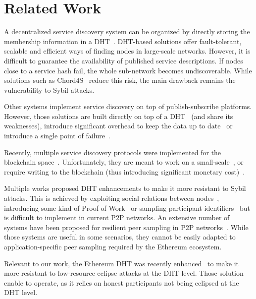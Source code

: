 
\section{Related Work}
\label{sec:related}


A decentralized service discovery system can be organized by directly storing the membership information in a DHT~\cite{can,chord,rowstron2001pastry,maymounkov2002kademlia}. 
DHT-based solutions offer fault-tolerant, scalable and efficient ways of finding nodes in large-scale networks.
However, it is difficult to guarantee the availability of published service descriptions.
If nodes close to a service hash fail, the whole sub-network becomes undiscoverable. 
While solutions such as Chord4S~\cite{chord4s} reduce this risk, the main drawback remains the vulnerability to Sybil attacks.

Other systems implement service discovery on top of publish-subscribe platforms. However, those solutions are built directly on top of a DHT~\cite{scribe,poldercast,banno2015} (and share its weaknesses), introduce significant overhead to keep the data up to date~\cite{gossipsub} or introduce a single point of failure~\cite{baldoni2007tera, dan2012centralized}.


Recently, multiple service discovery protocols were implemented for the blockchain space~\cite{farmer2021decentralized, manevich2019endorsement, keizer2021flock}. Unfortunately, they are meant to work on a small-scale~\cite{farmer2021decentralized}, or require writing to the blockchain (thus introducing significant monetary cost)~\cite{manevich2019endorsement, keizer2021flock}. 

Multiple works proposed DHT enhancements to make it more resistant to Sybil attacks. This is achieved by exploiting social relations between nodes~\cite{danezis2005sybil, danezis2009sybilinfer}, introducing some kind of Proof-of-Work~\cite{skad} or sampling participant identifiers~\cite{cholez2010efficient} but is difficult to implement in current P2P networks. An extensive number of systems have been proposed for resilient peer sampling in P2P networks~\cite{bortnikov2009brahms, jelasity2007gossip, ouguz2014stable, pigaglio2022raptee}. While those systems are useful in some scenarios, they cannot be easily adapted to application-specific peer sampling required by the Ethereum ecosystem. 


Relevant to our work, the Ethereum DHT was recently enhanced~\cite{marcus2018low, henningsen2019eclipsing} to make it more resistant to low-resource eclipse attacks at the DHT level. Those solution enable \sysname to operate, as it relies on honest participants not being eclipsed at the DHT level. 



